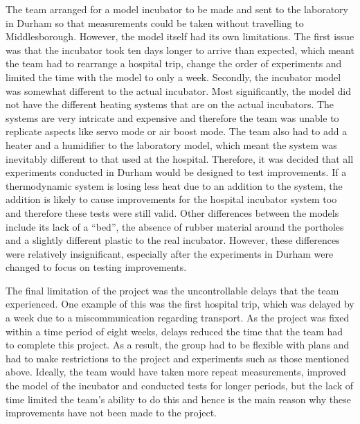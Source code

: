 \documentclass{article}
\begin{document}
\vspace{3mm}

The team arranged for a model incubator to be made and sent to the laboratory in Durham so that measurements could be taken without travelling to Middlesborough. However, the model itself had its own limitations. The first issue was that the incubator took ten days longer to arrive than expected, which meant the team had to rearrange a hospital trip, change the order of experiments and limited the time with the model to only a week. Secondly, the incubator model was somewhat different to the actual incubator. Most significantly, the model did not have the different heating systems that are on the actual incubators. The systems are very intricate and expensive and therefore the team was unable to replicate aspects like servo mode or air boost mode. The team also had to add a heater and a humidifier to the laboratory model, which meant the system was inevitably different to that used at the hospital. Therefore, it was decided that all experiments conducted in Durham would be designed to test improvements. If a thermodynamic system is losing less heat due to an addition to the system, the addition is likely to cause improvements for the hospital incubator system too and therefore these tests were still valid. Other differences between the models include its lack of a “bed”, the absence of rubber material around the portholes and a slightly different plastic to the real incubator. However, these differences were relatively insignificant, especially after the experiments in Durham were changed to focus on testing improvements.

\vspace{3mm}

The final limitation of the project was the uncontrollable delays that the team experienced. One example of this was the first hospital trip, which was delayed by a week due to a miscommunication regarding transport. As the project was fixed within a time period of eight weeks, delays reduced the time that the team had to complete this project. As a result, the group had to be flexible with plans and had to make restrictions to the project and experiments such as those mentioned above. Ideally, the team would have taken more repeat measurements, improved the model of the incubator and conducted tests for longer periods, but the lack of time limited the team’s ability to do this and hence is the main reason why these improvements have not been made to the project.

\vspace{3mm}
\end{document}
